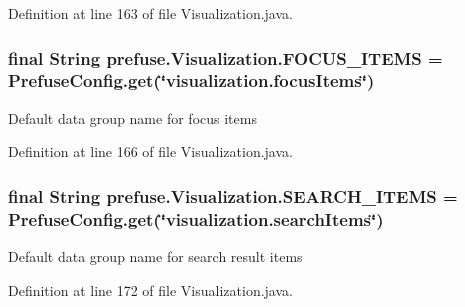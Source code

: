 \-Definition at line 163 of file \-Visualization.\-java.

\hypertarget{classprefuse_1_1_visualization_af0008fce03c57f8b98e3b697f4134ded}{
\subsubsection[{\-F\-O\-C\-U\-S\-\_\-\-I\-T\-E\-M\-S}]{\setlength{\rightskip}{0pt plus 5cm}final \-String {\bf prefuse.\-Visualization.\-F\-O\-C\-U\-S\-\_\-\-I\-T\-E\-M\-S} = \-Prefuse\-Config.\-get(\char`\"{}visualization.\-focus\-Items\char`\"{})}}\label{classprefuse_1_1_visualization_af0008fce03c57f8b98e3b697f4134ded}
\-Default data group name for focus items 

\-Definition at line 166 of file \-Visualization.\-java.

\hypertarget{classprefuse_1_1_visualization_a323513dc089f3642f95b17ddf6da3881}{
\subsubsection[{\-S\-E\-A\-R\-C\-H\-\_\-\-I\-T\-E\-M\-S}]{\setlength{\rightskip}{0pt plus 5cm}final \-String {\bf prefuse.\-Visualization.\-S\-E\-A\-R\-C\-H\-\_\-\-I\-T\-E\-M\-S} = \-Prefuse\-Config.\-get(\char`\"{}visualization.\-search\-Items\char`\"{})}}\label{classprefuse_1_1_visualization_a323513dc089f3642f95b17ddf6da3881}
\-Default data group name for search result items 

\-Definition at line 172 of file \-Visualization.\-java.

